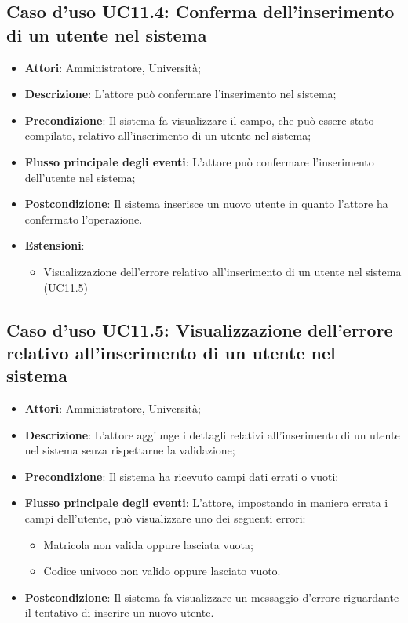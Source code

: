 \subsection{Caso d'uso \texorpdfstring{UC11.4}{UC11.4}: Conferma dell'inserimento di un utente nel sistema}
\begin{itemize}
\item \textbf{Attori}: Amministratore, Università;
\item \textbf{Descrizione}: L'attore può confermare l'inserimento nel sistema;
\item \textbf{Precondizione}: Il sistema fa visualizzare il campo, che può essere stato compilato, relativo all'inserimento di un utente nel sistema;
\item \textbf{Flusso principale degli eventi}: L'attore può confermare l'inserimento dell'utente nel sistema;
\item \textbf{Postcondizione}: Il sistema inserisce un nuovo utente in quanto l'attore ha confermato l'operazione.

\item \textbf{Estensioni}:
\begin{itemize}
\item Visualizzazione dell'errore relativo all'inserimento di un utente nel sistema (UC11.5)
\end{itemize}
\end{itemize}
\subsection{Caso d'uso \texorpdfstring{UC11.5}{UC11.5}: Visualizzazione dell'errore relativo all'inserimento di un utente nel sistema}
\begin{itemize}
\item \textbf{Attori}: Amministratore, Università;
\item \textbf{Descrizione}: L'attore aggiunge i dettagli relativi all'inserimento di un utente nel sistema senza rispettarne la validazione;
\item \textbf{Precondizione}: Il sistema ha ricevuto campi dati errati o vuoti;


\item \textbf{Flusso principale degli eventi}: L'attore, impostando in maniera errata i campi dell'utente, può visualizzare uno dei seguenti errori:
\begin{itemize}
\item Matricola non valida oppure lasciata vuota;
\item Codice univoco non valido oppure lasciato vuoto.
\end{itemize}
\item \textbf{Postcondizione}: Il sistema fa visualizzare un messaggio d'errore riguardante il tentativo di inserire un nuovo utente.

\end{itemize}
